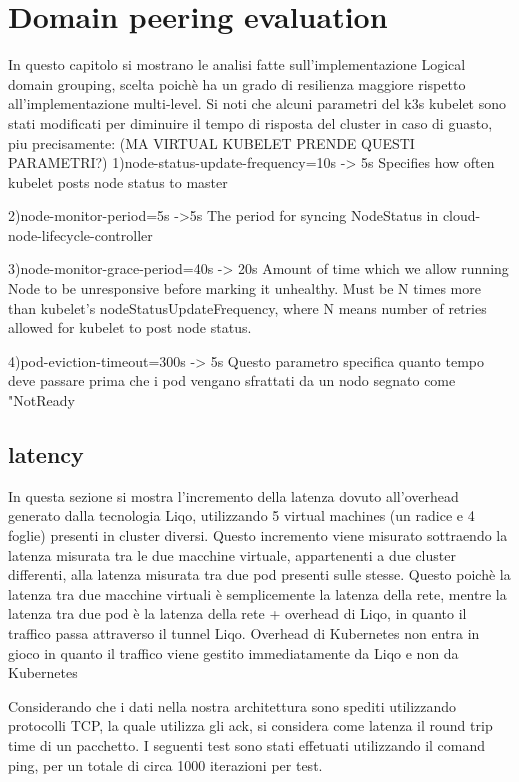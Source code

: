 \chapter{Domain peering evaluation}
In questo capitolo si mostrano le analisi fatte sull'implementazione Logical domain grouping, scelta poichè ha un grado di resilienza maggiore rispetto all'implementazione multi-level.
Si noti che alcuni parametri del k3s kubelet sono stati modificati per diminuire il tempo di risposta del cluster in caso di guasto, piu precisamente:
 (MA VIRTUAL KUBELET PRENDE QUESTI PARAMETRI?)
1)node-status-update-frequency=10s -> 5s 
Specifies how often kubelet posts node status to master

2)node-monitor-period=5s ->5s 
The period for syncing NodeStatus in cloud-node-lifecycle-controller

3)node-monitor-grace-period=40s -> 20s
Amount of time which we allow running Node to be unresponsive before marking it unhealthy. Must be N times more than kubelet's nodeStatusUpdateFrequency, where N means number of retries allowed for kubelet to post node status.

4)pod-eviction-timeout=300s -> 5s
Questo parametro specifica quanto tempo deve passare prima che i pod vengano sfrattati da un nodo segnato come "NotReady


\section{latency}
In questa sezione si mostra l'incremento della latenza dovuto all'overhead generato dalla tecnologia Liqo, utilizzando 5 virtual machines (un radice e 4 foglie) presenti in cluster diversi. Questo incremento viene misurato sottraendo la latenza misurata tra le due macchine virtuale, appartenenti a due cluster differenti, alla latenza misurata tra due pod presenti sulle stesse. Questo poichè la latenza tra due macchine virtuali è semplicemente la latenza della rete, mentre la latenza tra due pod è la latenza della rete + overhead di Liqo, in quanto il traffico passa attraverso il tunnel Liqo. Overhead di Kubernetes non entra in gioco in quanto il traffico viene gestito immediatamente da Liqo e non da Kubernetes

Considerando che i dati nella nostra architettura sono spediti utilizzando protocolli TCP, la quale utilizza gli ack, si considera come latenza il round trip time di un pacchetto. I seguenti test sono stati effetuati utilizzando il comand ping, per un totale di circa 1000 iterazioni per test.

